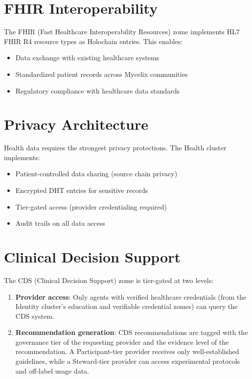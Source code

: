 \documentclass[12pt]{book}
\begin{document}
\section{FHIR Interoperability}

The FHIR (Fast Healthcare Interoperability Resources) zome implements HL7 FHIR
R4 resource types as Holochain entries. This enables:

\begin{itemize}
  \item Data exchange with existing healthcare systems
  \item Standardized patient records across Mycelix communities
  \item Regulatory compliance with healthcare data standards
\end{itemize}

\section{Privacy Architecture}

Health data requires the strongest privacy protections. The Health cluster
implements:

\begin{itemize}
  \item Patient-controlled data sharing (source chain privacy)
  \item Encrypted DHT entries for sensitive records
  \item Tier-gated access (provider credentialing required)
  \item Audit trails on all data access
\end{itemize}

\section{Clinical Decision Support}

The CDS (Clinical Decision Support) zome is tier-gated at two levels:

\begin{enumerate}
  \item \textbf{Provider access}: Only agents with verified healthcare
    credentials (from the Identity cluster's education and verifiable
    credential zomes) can query the CDS system.
  \item \textbf{Recommendation generation}: CDS recommendations are tagged
    with the governance tier of the requesting provider and the evidence
    level of the recommendation. A Participant-tier provider receives only
    well-established guidelines, while a Steward-tier provider can access
    experimental protocols and off-label usage data.
\end{enumerate}
\end{document}
